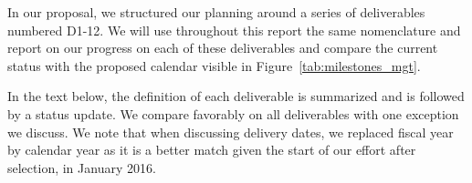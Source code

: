 
\begin{summary}
In our proposal, we structured our planning around a series of
deliverables numbered D1-12. We will use throughout this report the same
nomenclature and report on our progress on each of these deliverables and compare the current status with the proposed calendar visible in Figure~\ref{tab:milestones_mgt}.

In the text below, the definition of each deliverable is summarized and is followed by a status update. We compare favorably on all deliverables with one exception we discuss. We note that when discussing delivery dates, we replaced fiscal year by calendar year as it is a better match given the start of our effort after selection, in January 2016.
\end{summary}









